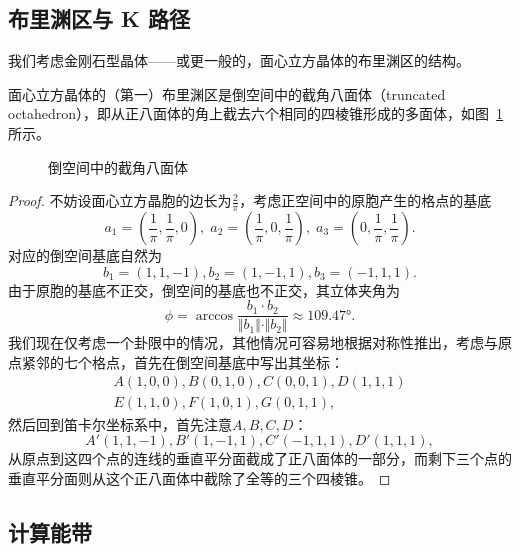 \subsection{布里渊区与 K 路径}

我们考虑金刚石型晶体——或更一般的，面心立方晶体的布里渊区的结构。

\begin{proposition}
    面心立方晶体的（第一）布里渊区是倒空间中的截角八面体（truncated octahedron），即从正八面体的角上截去六个相同的四棱锥形成的多面体，如图~\ref{fig:truncated-octahedron}所示。
\end{proposition}

\begin{figure}[ht!]
    \centering
    
    \caption{倒空间中的截角八面体}
    \label{fig:truncated-octahedron}
\end{figure}

\begin{proof}
    不妨设面心立方晶胞的边长为$\frac{2}{\pi}$，考虑正空间中的原胞产生的格点的基底
    \begin{equation}
        a_1 = (\frac{1}{\pi}, \frac{1}{\pi}, 0), \; a_2 = (\frac{1}{\pi}, 0, \frac{1}{\pi}), \; a_3 = (0, \frac{1}{\pi}, \frac{1}{\pi}).
    \end{equation}
    对应的倒空间基底自然为
    \begin{equation}
        b_1 =  (1, 1, -1), b_2 = (1, -1, 1), b_3 = (- 1, 1, 1).
    \end{equation}
    由于原胞的基底不正交，倒空间的基底也不正交，其立体夹角为
    \begin{equation}
        \phi = \arccos \frac{b_1 \cdot b_2}{\Vert b_1 \Vert \cdot \Vert b_2 \Vert} \approx \ang{109.47}.
    \end{equation}
    我们现在仅考虑一个卦限中的情况，其他情况可容易地根据对称性推出，考虑与原点紧邻的七个格点，首先在倒空间基底中写出其坐标：
    \begin{equation}
        \begin{aligned}
            A(1, 0, 0), B(0, 1, 0), C(0, 0, 1), D(1, 1, 1) \\
            E(1, 1, 0), F(1, 0, 1), G(0, 1, 1), 
        \end{aligned}
    \end{equation}
    然后回到笛卡尔坐标系中，首先注意$A, B, C, D$：
    \begin{equation}
        A' (1, 1, -1), B' (1, -1, 1), C'(-1, 1, 1), D'(1, 1, 1),
    \end{equation}
    从原点到这四个点的连线的垂直平分面截成了正八面体的一部分，而剩下三个点的垂直平分面则从这个正八面体中截除了全等的三个四棱锥。
\end{proof}

\subsection{计算能带}

